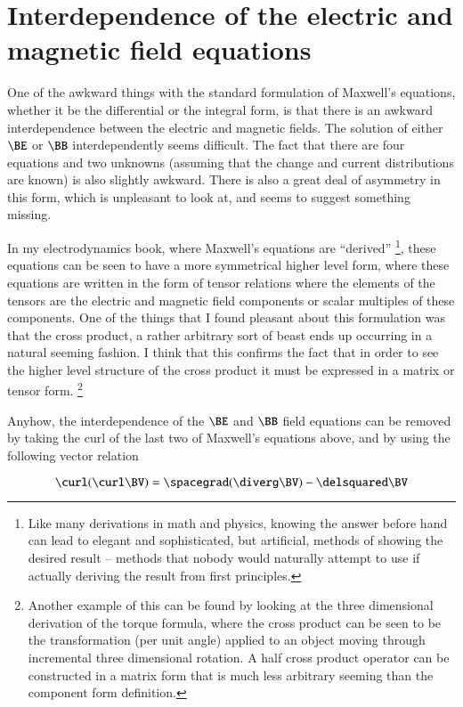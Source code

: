 \section{Interdependence of the electric and magnetic field equations}

One of the awkward things with the standard formulation of 
Maxwell's equations, whether it be the 
differential or the integral form, is that there 
is an awkward interdependence between the electric and magnetic fields. 
The solution of either $\BE$ or $\BB$ interdependently seems difficult.  The 
fact that there are four equations and two unknowns (assuming that the 
change and current distributions are known) is also slightly awkward.
There is also a great deal of asymmetry in this form, which is unpleasant
to look at, and seems to suggest something missing.

In my electrodynamics book, where Maxwell's equations are ``derived''
\footnote
{
Like many derivations in math and physics, knowing the answer before hand
can lead to elegant and sophisticated, but artificial, methods of showing the desired result --
methods that
nobody would naturally attempt to use if actually deriving the result from first principles.
},
these equations can be seen to have a more symmetrical higher level form, where
these equations are written in the form of tensor relations where
the elements of the tensors are the electric and magnetic field components 
or scalar multiples of these components.  One of the things that I found 
pleasant about this formulation was that the cross product, a rather 
arbitrary sort of beast ends up occurring in a natural seeming fashion.  I 
think that this confirms the fact that in order to see the higher level 
structure of the cross product it must be expressed in a matrix or tensor form.
\footnote{
Another example of this can be found by looking at the three dimensional 
derivation of the torque formula, where the 
cross product can be seen to be the transformation (per unit angle)
applied to an object moving through incremental three dimensional 
rotation.  A half cross product operator can be constructed in a matrix form 
that is much less arbitrary seeming than the component form definition.
}

Anyhow, 
the interdependence of the $\BE$ and $\BB$ field equations can be removed by taking the
curl of the last two of Maxwell's equations above, and by using the following
vector relation

\begin{equation*}
\curl (\curl \BV) = \spacegrad (\diverg \BV) - \delsquared \BV
\end{equation*}

